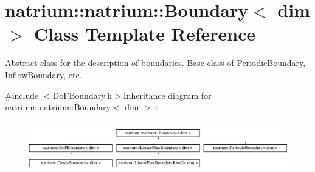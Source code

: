 \hypertarget{classnatrium_1_1natrium_1_1Boundary}{
\section{natrium::natrium::Boundary$<$ dim $>$ Class Template Reference}
\label{classnatrium_1_1natrium_1_1Boundary}
}


Abstract class for the description of boundaries. Base class of \hyperlink{classnatrium_1_1PeriodicBoundary}{PeriodicBoundary}, InflowBoundary, etc.  


{\ttfamily \#include $<$DoFBoundary.h$>$}Inheritance diagram for natrium::natrium::Boundary$<$ dim $>$::\begin{figure}[H]
\begin{center}
\leavevmode
\includegraphics[height=2.19608cm]{classnatrium_1_1natrium_1_1Boundary}
\end{center}
\end{figure}

